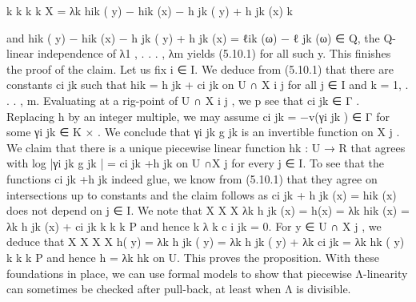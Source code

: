 \documentclass[
  10pt,
]{article}
\newenvironment{Shaded}{}{}
\newcommand{\NormalTok}[1]{#1}
\begin{document}
\begin{Shaded}
\begin{Highlighting}[]
\NormalTok{                        k                   k                    k                      k}
\NormalTok{                        X                                                      }
\NormalTok{                   =         λk hik ( y) − hik (x) − h jk ( y) + h jk (x)}
\NormalTok{                         k}

\NormalTok{and hik ( y) − hik (x) − h jk ( y) + h jk (x) = ℓik (ω) − ℓ jk (ω) ∈ Q, the Q{-}linear independence}
\NormalTok{of λ1 , . . . , λm yields (5.10.1) for all such y. This finishes the proof of the claim.}
\NormalTok{    Let us fix i ∈ I. We deduce from (5.10.1) that there are constants ci jk such that hik =}
\NormalTok{h jk + ci jk on U ∩ X i j for all j ∈ I and k = 1, . . . , m. Evaluating at a rig{-}point of U ∩ X i j , we}
\NormalTok{                    p}
\NormalTok{see that ci jk ∈ Γ . Replacing h by an integer multiple, we may assume ci jk = −v(γi jk ) ∈ Γ}
\NormalTok{for some γi jk ∈ K × . We conclude that γi jk g jk is an invertible function on X j . We claim}
\NormalTok{that there is a unique piecewise linear function hk : U → R that agrees with log |γi jk g jk | =}
\NormalTok{ci jk +h jk on U ∩X j for every j ∈ I. To see that the functions ci jk +h jk indeed glue, we know}
\NormalTok{from (5.10.1) that they agree on intersections up to constants and the claim follows as}
\NormalTok{ci jk + h jk (x) = hik (x) does not depend on j ∈ I. We note that}
\NormalTok{                     X                        X                  X                      }
\NormalTok{                         λk h jk (x) = h(x) =    λk hik (x) =       λk h jk (x) + ci jk}
\NormalTok{                    k                                 k                    k}
\NormalTok{             P}
\NormalTok{and hence        k λ k c i jk = 0. For y ∈ U ∩ X j , we deduce that}
\NormalTok{                             X                    X                    X                X}
\NormalTok{                 h( y) =         λk h jk ( y) =       λk h jk ( y) +       λk ci jk =       λk hk ( y)}
\NormalTok{                             k                    k                    k}
\NormalTok{                   P}
\NormalTok{and hence h =           λk hk on U. This proves the proposition.                                         }
\NormalTok{  With these foundations in place, we can use formal models to show that piecewise}
\NormalTok{Λ{-}linearity can sometimes be checked after pull{-}back, at least when Λ is divisible.}

\end{Highlighting}
\end{Shaded}
\end{document}
